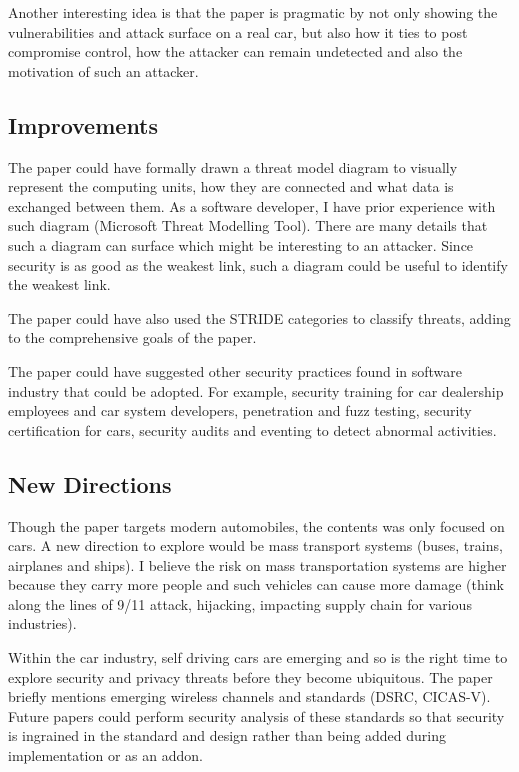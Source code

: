\documentclass[12pt]{article}
\begin{document}
    Another interesting idea is that the paper is pragmatic by not only showing the vulnerabilities and attack surface on a real car, but also how it ties to post compromise control, how the attacker can remain undetected and also the motivation of such an attacker.

    \subsection*{Improvements}
    The paper could have formally drawn a threat model diagram to visually represent the computing units, how they are connected and what data is exchanged between them. As a software developer, I have prior experience with such diagram (Microsoft Threat Modelling Tool). There are many details that such a diagram can surface which might be interesting to an attacker. Since security is as good as the weakest link, such a diagram could be useful to identify the weakest link.

    The paper could have also used the STRIDE categories to classify threats, adding to the comprehensive goals of the paper.

    The paper could have suggested other security practices found in software industry that could be adopted. For example, security training for car dealership employees and car system developers, penetration and fuzz testing, security certification for cars, security audits and eventing to detect abnormal activities.

    \subsection*{New Directions}
    Though the paper targets modern automobiles, the contents was only focused on cars. A new direction to explore would be mass transport systems (buses, trains, airplanes and ships). I believe the risk on mass transportation systems are higher because they carry more people and such vehicles can cause more damage (think along the lines of 9/11 attack, hijacking, impacting supply chain for various industries).

    Within the car industry, self driving cars are emerging and so is the right time to explore security and privacy threats before they become ubiquitous. The paper briefly mentions emerging wireless channels and standards (DSRC, CICAS-V). Future papers could perform security analysis of these standards so that security is ingrained in the standard and design rather than being added during implementation or as an addon.
\end{document}

